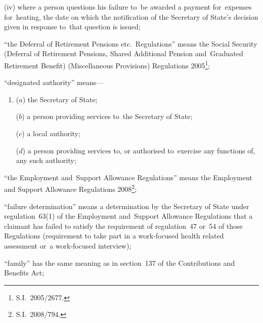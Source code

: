 \documentclass[12pt,a4paper]{article}
\begin{document}
\begin{enumerate}
\begin{enumerate}
\begin{enumerate}
(iv) where a person questions his failure to~be awarded a payment for~expenses for~heating, the date on which the notification of the Secretary of State’s decision given in response to~that question is issued;
\end{enumerate}
\end{enumerate}

“the Deferral of Retirement Pensions etc.\ Regulations” means the Social Security (Deferral of Retirement Pensions, Shared Additional Pension and~Graduated Retirement Benefit) (Miscellaneous Provisions) Regulations 2005\footnote{S.I.~2005/2677.};


“designated authority” means—
\begin{enumerate}\item[]
    ($a$)     the Secretary of State;

    ($b$) 
    a person providing services to~the Secretary of State;

    ($c$) 
    a local authority;

    ($d$) 
    a person providing services to, or authorised to~exercise any functions of, any such authority;
\end{enumerate}

“the Employment and~Support Allowance Regulations” means the Employment and Support Allowance Regulations 2008\footnote{S.I.~2008/794.};

“failure determination” means a determination by the Secretary of State under regulation~63(1) of the Employment and~Support Allowance Regulations that a claimant has failed to satisfy the requirement of regulation~47 or~54 of those Regulations (requirement to take part in a work-focused health related assessment or~a work-focused interview);

“family” has the same meaning as in section~137 of the Contributions and Benefits Act;


\end{enumerate}
\end{document}
